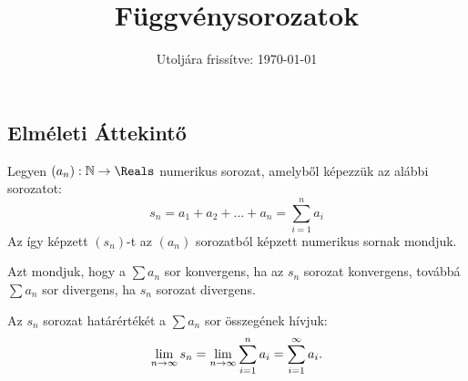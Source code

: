 \documentclass[a4paper, 12pt]{scrartcl}
\title{Függvénysorozatok}
\date{Utoljára frissítve: \today}
\begin{document}
\maketitle

\subsection{Elméleti Áttekintő}

\begin{definition}
  Legyen $(a_n) : \mathbb{N} \rightarrow \Reals$ numerikus sorozat, amelyből
  képezzük az alábbi sorozatot:
  $$
    s_n = a_1 + a_2 + \dots + a_n = \sum_{i=1}^{n} a_i
  $$
  Az így képzett $(s_n)$-t az $(a_n)$ sorozatból képzett numerikus sornak
  mondjuk.

  Azt mondjuk, hogy a $\sum a_n$ sor konvergens, ha az $s_n$ sorozat konvergens,
  továbbá $\sum a_n$ sor divergens, ha $s_n$ sorozat divergens.

  Az $s_n$ sorozat határértékét a $\sum a_n$ sor összegének hívjuk:
  $$
    \lim_{n \rightarrow \infty} s_n = \lim_{n \rightarrow \infty}
    \sum_{i=1}^n a_i=\sum_{i=1}^\infty a_i
    \text.
  $$
\end{definition}
\end{document}
